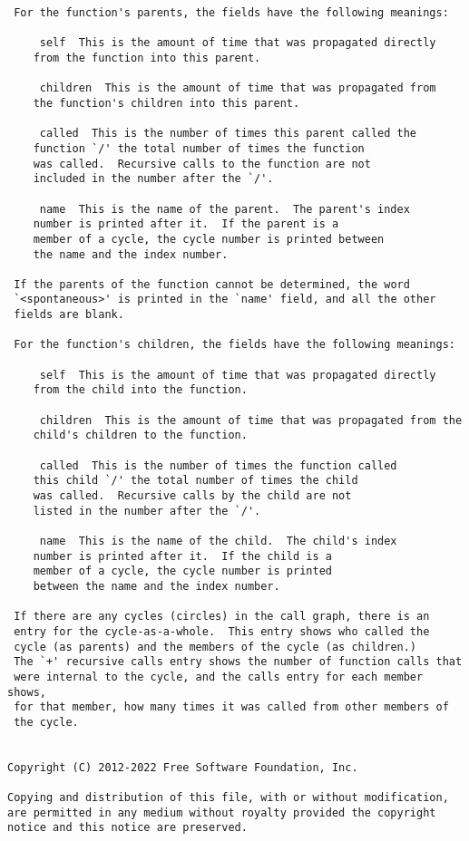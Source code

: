 \documentclass[12pt]{article}
\begin{document}
\begin{lstlisting}
 For the function's parents, the fields have the following meanings:

     self  This is the amount of time that was propagated directly
    from the function into this parent.

     children  This is the amount of time that was propagated from
    the function's children into this parent.

     called  This is the number of times this parent called the
    function `/' the total number of times the function
    was called.  Recursive calls to the function are not
    included in the number after the `/'.

     name  This is the name of the parent.  The parent's index
    number is printed after it.  If the parent is a
    member of a cycle, the cycle number is printed between
    the name and the index number.

 If the parents of the function cannot be determined, the word
 `<spontaneous>' is printed in the `name' field, and all the other
 fields are blank.

 For the function's children, the fields have the following meanings:

     self  This is the amount of time that was propagated directly
    from the child into the function.

     children  This is the amount of time that was propagated from the
    child's children to the function.

     called  This is the number of times the function called
    this child `/' the total number of times the child
    was called.  Recursive calls by the child are not
    listed in the number after the `/'.

     name  This is the name of the child.  The child's index
    number is printed after it.  If the child is a
    member of a cycle, the cycle number is printed
    between the name and the index number.

 If there are any cycles (circles) in the call graph, there is an
 entry for the cycle-as-a-whole.  This entry shows who called the
 cycle (as parents) and the members of the cycle (as children.)
 The `+' recursive calls entry shows the number of function calls that
 were internal to the cycle, and the calls entry for each member shows,
 for that member, how many times it was called from other members of
 the cycle.


Copyright (C) 2012-2022 Free Software Foundation, Inc.

Copying and distribution of this file, with or without modification,
are permitted in any medium without royalty provided the copyright
notice and this notice are preserved.



\end{lstlisting}
\end{document}
